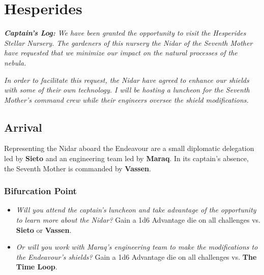 \documentclass[11pt, a5paper, parskip=half-, DIV=12]{scrartcl}
\begin{document}
\section*{Hesperides}
\textit{\textbf{Captain's Log:} We have been granted the opportunity to visit the Hesperides Stellar Nursery. The gardeners of this nursery \textemdash{} the Nidar of the Seventh Mother \textemdash{} have requested that we minimize our impact on the natural processes of the nebula.}


\textit{In order to facilitate this request, the Nidar have agreed to enhance our shields with some of their own technology. I will be hosting a luncheon for the Seventh Mother's command crew while their engineers oversee the shield modifications.}

\subsection*{Arrival}
Representing the Nidar aboard the Endeavour are a small diplomatic delegation led by \textbf{Sieto} and an engineering team led by \textbf{Maraq}.
In its captain's absence, the Seventh Mother is commanded by \textbf{Vassen}.
\subsubsection*{Bifurcation Point}
\begin{itemize}
	\item \textit{Will you attend the captain's luncheon and take advantage of the opportunity to learn more about the Nidar?}
	Gain a 1d6 Advantage die on all challenges vs. \textbf{Sieto} or \textbf{Vassen}.
	\item \textit{Or will you work with Maraq's engineering team to make the modifications to the Endeavour's shields?}
	Gain a 1d6 Advantage die on all challenges vs. \textbf{The Time Loop}. 
\end{itemize}
\end{document}
